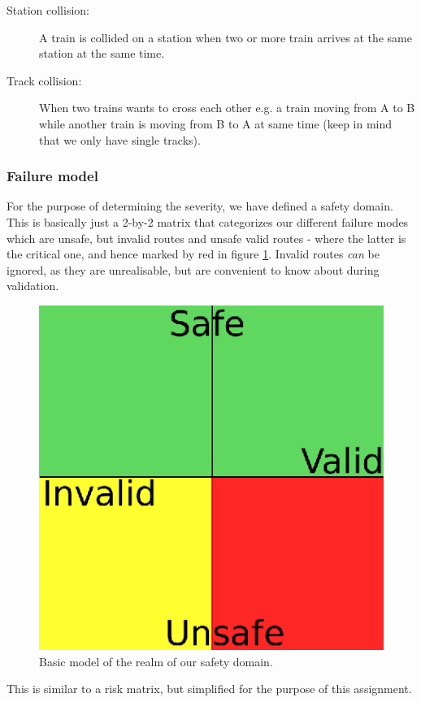 \documentclass[10pt,a4paper]{article}
\begin{document}
\begin{description}

\item[Station collision:]
A train is collided on a station when two or more train arrives at the same station at the same time.
\item[Track collision:]
When two trains wants to cross each other e.g. a train moving from A to B while another train is moving from B to A at same time (keep in mind that we only have single tracks).
\end{description}

\subsubsection{Failure model}
For the purpose of determining the severity, we have defined a safety domain. This is basically just a 2-by-2 matrix that categorizes our different failure modes which are unsafe, but invalid routes and unsafe valid routes - where the latter is the critical one, and hence marked by red in figure \ref{fig:safety_domain}. Invalid routes \emph{can} be ignored, as they are unrealisable, but are convenient to know about during validation.

\begin{figure}[h]
\centering
\includegraphics[scale=0.5]{fig/Safety_domains.eps}
 \caption{Basic model of the realm of our safety domain.}
 \label{fig:safety_domain}
\end{figure}
This is similar to a risk matrix, but simplified for the purpose of this assignment.
\end{document}
